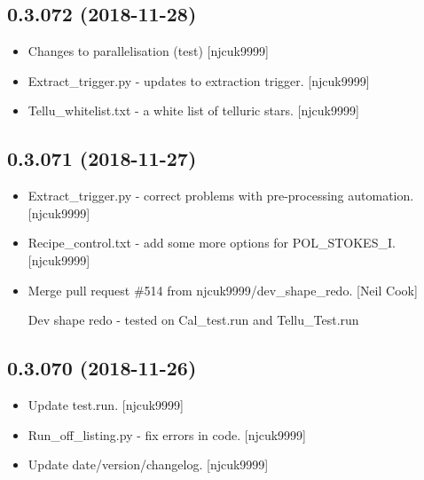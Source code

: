 \documentclass[a4paper,10pt,english]{report}
\begin{document}
\subsection{0.3.072 (2018-11-28)}
\label{\detokenize{misc/changelog:id249}}\begin{itemize}
\item {} 
Changes to parallelisation (test) {[}njcuk9999{]}

\item {} 
Extract\_trigger.py - updates to extraction trigger. {[}njcuk9999{]}

\item {} 
Tellu\_whitelist.txt - a white list of telluric stars. {[}njcuk9999{]}

\end{itemize}


\subsection{0.3.071 (2018-11-27)}
\label{\detokenize{misc/changelog:id250}}\begin{itemize}
\item {} 
Extract\_trigger.py - correct problems with pre-processing automation.
{[}njcuk9999{]}

\item {} 
Recipe\_control.txt - add some more options for POL\_STOKES\_I.
{[}njcuk9999{]}

\item {} 
Merge pull request \#514 from njcuk9999/dev\_shape\_redo. {[}Neil Cook{]}

Dev shape redo - tested on Cal\_test.run and Tellu\_Test.run

\end{itemize}


\subsection{0.3.070 (2018-11-26)}
\label{\detokenize{misc/changelog:id251}}\begin{itemize}
\item {} 
Update test.run. {[}njcuk9999{]}

\item {} 
Run\_off\_listing.py - fix errors in code. {[}njcuk9999{]}

\item {} 
Update date/version/changelog. {[}njcuk9999{]}

\end{itemize}
\end{document}
